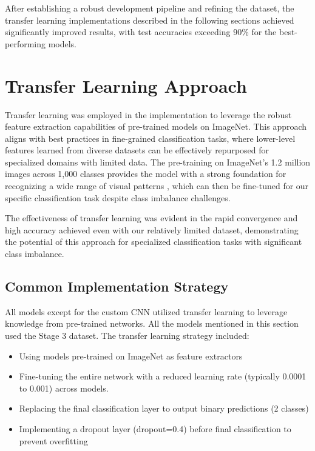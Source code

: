 \documentclass[a4paper,12pt]{report}
\begin{document}
After establishing a robust development pipeline and refining the dataset, the transfer learning implementations described in the following sections achieved significantly improved results, with test accuracies exceeding 90\% for the best-performing models.

\section{Transfer Learning Approach}

Transfer learning was employed in the implementation to leverage the robust feature extraction capabilities of pre-trained models on ImageNet. This approach aligns with best practices in fine-grained classification tasks, where lower-level features learned from diverse datasets can be effectively repurposed for specialized domains with limited data. The pre-training on ImageNet's 1.2 million images across 1,000 classes provides the model with a strong foundation for recognizing a wide range of visual patterns \citep{krizhevsky2012imagenet}, which can then be fine-tuned for our specific classification task despite class imbalance challenges.

The effectiveness of transfer learning was evident in the rapid convergence and high accuracy achieved even with our relatively limited dataset, demonstrating the potential of this approach for specialized classification tasks with significant class imbalance.

\subsection{Common Implementation Strategy} \label{sec:common}

All models except for the custom CNN utilized transfer learning to leverage knowledge from pre-trained networks. All the models mentioned in this section used the Stage 3 dataset. The transfer learning strategy included:

\begin{itemize}
    \item Using models pre-trained on ImageNet as feature extractors
    \item Fine-tuning the entire network with a reduced learning rate (typically 0.0001 to 0.001) across models.
    \item Replacing the final classification layer to output binary predictions (2 classes)
    \item Implementing a dropout layer (dropout=0.4) before final classification to prevent overfitting
\end{itemize}
\end{document}
